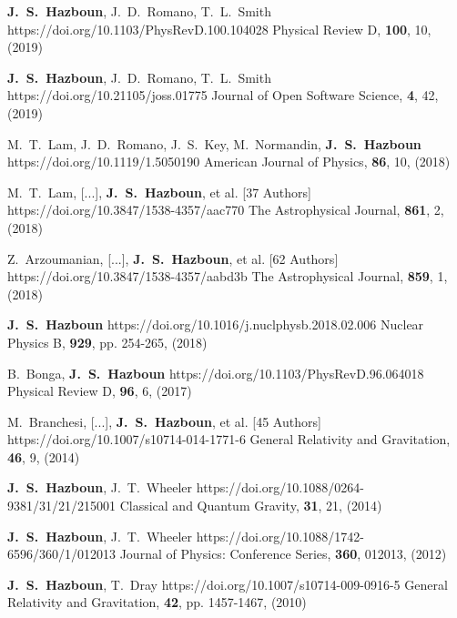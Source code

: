          {\textbf{J.~S.~Hazboun}, J.~D.~{Romano}, T.~L.~{Smith}}
         {https://doi.org/10.1103/PhysRevD.100.104028}
         {{Physical Review D}, \textbf{100}, 10, (2019)}

         {\textbf{J.~S.~Hazboun}, J.~D.~{Romano}, T.~L.~{Smith}}
         {https://doi.org/10.21105/joss.01775}
         {{Journal of Open Software Science}, \textbf{4}, 42, (2019)}

         {M.~T.~{Lam}, J.~D.~{Romano}, J.~S.~{Key}, M.~{Normandin}, \textbf{J.~S.~Hazboun}}
         {https://doi.org/10.1119/1.5050190}
         {{American Journal of Physics}, \textbf{86}, 10, (2018)}

         {M.~T.~{Lam}, [...], \textbf{J.~S.~{Hazboun}}, et al. [37 Authors]}
         {https://doi.org/10.3847/1538-4357/aac770}
         {{The Astrophysical Journal}, \textbf{861}, 2, (2018)}

         {Z.~{Arzoumanian}, [...], \textbf{J.~S.~{Hazboun}}, et al. [62 Authors]}
         {https://doi.org/10.3847/1538-4357/aabd3b}
         {{The Astrophysical Journal}, \textbf{859}, 1, (2018)}

         {\textbf{J.~S.~Hazboun}}
         {https://doi.org/10.1016/j.nuclphysb.2018.02.006}
         {{Nuclear Physics B}, \textbf{929}, pp. 254-265, (2018)}

         {B.~{Bonga}, \textbf{J.~S.~Hazboun}}
         {https://doi.org/10.1103/PhysRevD.96.064018}
         {{Physical Review D}, \textbf{96}, 6, (2017)}

         {M.~{Branchesi}, [...], \textbf{J.~S.~{Hazboun}}, et al. [45 Authors]}
         {https://doi.org/10.1007/s10714-014-1771-6}
         {{General Relativity and Gravitation}, \textbf{46}, 9, (2014)}

         {\textbf{J.~S.~Hazboun}, J.~T.~Wheeler}
         {https://doi.org/10.1088/0264-9381/31/21/215001}
         {{Classical and Quantum Gravity}, \textbf{31}, 21, (2014)}

         {\textbf{J.~S.~Hazboun}, J.~T.~{Wheeler}}
         {https://doi.org/10.1088/1742-6596/360/1/012013}
         {{Journal of Physics: Conference Series}, \textbf{360}, 012013, (2012)}

         {\textbf{J.~S.~Hazboun}, T.~{Dray}}
         {https://doi.org/10.1007/s10714-009-0916-5}
         {{General Relativity and Gravitation}, \textbf{42}, pp. 1457-1467, (2010)}

